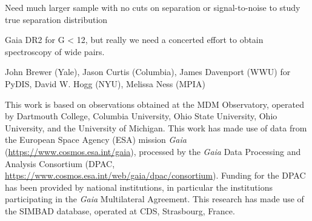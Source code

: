 \documentclass[modern, letterpaper]{aastex61}
\begin{document}
Need much larger sample with no cuts on separation or signal-to-noise to study true separation distribution

Gaia DR2 for G < 12, but really we need a concerted effort to obtain spectroscopy of wide pairs.

\acknowledgements
John Brewer (Yale),
Jason Curtis (Columbia),
James Davenport (WWU) for PyDIS,
David W. Hogg (NYU),
Melissa Ness (MPIA)

This work is based on observations obtained at the MDM Observatory, operated by
Dartmouth College, Columbia University, Ohio State University, Ohio University,
and the University of Michigan.
This work has made use of data from the European Space Agency (ESA)
mission {\it Gaia} (\url{https://www.cosmos.esa.int/gaia}), processed by
the {\it Gaia} Data Processing and Analysis Consortium (DPAC,
\url{https://www.cosmos.esa.int/web/gaia/dpac/consortium}). Funding
for the DPAC has been provided by national institutions, in particular
the institutions participating in the {\it Gaia} Multilateral Agreement.
This research has made use of the SIMBAD database, operated at CDS, Strasbourg,
France.





\end{document}
